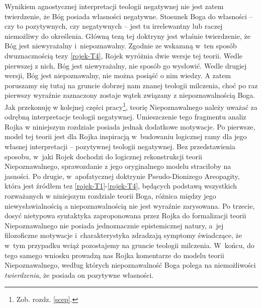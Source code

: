 Wynikiem agnostycznej
interpretacji teologii negatywnej nie jest zatem twierdzenie, że Bóg posiada
własności negatywne. Stosunek Boga do własności -- czy to pozytywnych, czy negatywnych -- jest tu irrelewantny lub raczej niemożliwy do określenia. Główną tezą tej doktryny jest właśnie twierdzenie, że Bóg jest niewyrażalny i~niepoznawalny. 
Zgodnie ze wskazaną w~ten sposób dwuznacznością tezy \eqref{rojek-T4},
Rojek wyróżnia dwie wersje tej teorii. Wedle pierwszej z nich, Bóg jest
niewyrażalny, nie sposób go wysłowić.
Wedle drugiej wersji, Bóg jest
niepoznawalny, nie można posiąść o nim wiedzy.
A zatem poruszamy się tutaj na gruncie dobrzej nam znanej teologii milczenia, choć po raz pierwszy wyraźnie zaznaczony zostaje
wątek związany z niepoznawalnością Boga. Jak przekonuję w kolejnej części pracy\footnote{Zob. rozdz. \ref{scep}.}, teorię Niepoznawalnego należy
uważać za odrębną interpretacje teologii negatywnej. Umieszczenie tego fragmentu analiz Rojka w niniejszym rozdziale posiada jednak dodatkowe motywacje.
Po pierwsze, model tej teorii jest dla Rojka inspiracją w~budowaniu logicznej ramy dla jego własnej interpretacji -- pozytywnej teologii negatywnej. Bez przedstawienia sposobu, w~jaki Rojek dochodzi do logicznej rekonstrukcji teorii Niepoznawalnego, sprawozdanie z jego oryginalnego modelu straciłoby na jasności.
Po drugie, w~apofatycznej doktrynie Pseudo-Dionizego Areopagity, która jest źródłem tez \eqref{rojek-T1}-\eqref{rojek-T4}, będących podstawą wszystkich rozważanych w niniejszym rozdziale teorii Boga, różnica między jego niewysławialnością a niepoznawalnością nie jest wyraźnie zarysowana.
Po trzecie, dosyć nietypowa syntaktyka zaproponowana przez Rojka do formalizacji teorii Niepoznawalnego nie posiada jednoznacznie epistemicznej natury, a~jej filozoficzne motywacje i~charakterystyka zdradzają symptomy świadczące, że w~tym przypadku wciąż pozostajemy na gruncie teologii milczenia.
W~końcu, do tego samego wniosku prowadzą nas Rojka komentarze do modelu teorii Niepoznawalnego, według których niepoznawalność Boga polega na niemożliwości \textit{twierdzenia}, że posiada on pozytywne własności.




